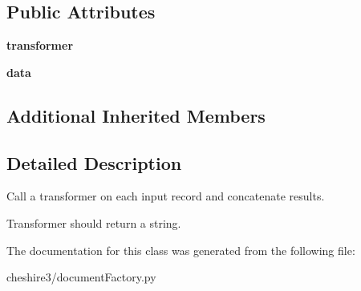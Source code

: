 \subsection*{Public Attributes}
\begin{DoxyCompactItemize}
\item 
\hypertarget{classcheshire3_1_1document_factory_1_1_acc_transformer_stream_a63db095f3aca0fa11f63470087ef3212}{{\bfseries transformer}}\label{classcheshire3_1_1document_factory_1_1_acc_transformer_stream_a63db095f3aca0fa11f63470087ef3212}

\item 
\hypertarget{classcheshire3_1_1document_factory_1_1_acc_transformer_stream_a0ed053d6ca02b13145ab0cc83a0e89a2}{{\bfseries data}}\label{classcheshire3_1_1document_factory_1_1_acc_transformer_stream_a0ed053d6ca02b13145ab0cc83a0e89a2}

\end{DoxyCompactItemize}
\subsection*{Additional Inherited Members}


\subsection{Detailed Description}
\begin{DoxyVerb}Call a transformer on each input record and concatenate results.

Transformer should return a string.
\end{DoxyVerb}
 

The documentation for this class was generated from the following file\-:\begin{DoxyCompactItemize}
\item 
cheshire3/document\-Factory.\-py\end{DoxyCompactItemize}

